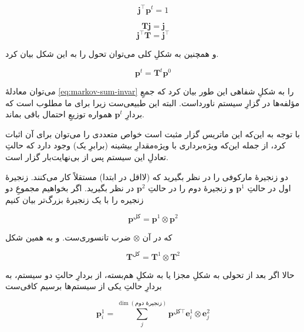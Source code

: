 \begin{equation} \mathbf{j}^\intercal \mathbf{p}^t = 1 \end{equation}

\begin{equation} \mathbf{T} \mathbf{j} = \mathbf{j} \end{equation}
\begin{equation} \mathbf{j}^\intercal \mathbf{T} = \mathbf{j}^\intercal \label{eq:markov-sum-invar} \end{equation}

و همچنین به شکلِ کلی می‌توان تحول را به این شکل بیان کرد.

\begin{equation} \mathbf{p}^t = \mathbf{T}^t \mathbf{p}^0 \end{equation}

می‌توان معادلهٔ 
\ref{eq:markov-sum-invar}
 را به شکلِ شفاهی این طور بیان کرد که جمعِ مؤلفه‌ها در گزارِ سیستم ناورداست. البته این طبیعی‌ست زیرا برای ما مطلوب است که بردارِ 
 \( \mathbf{p}^t \)
 همواره توزیعِ احتمال باقی بماند.

با توجه به این‌که این ماتریس گزار مثبت است خواص متعددی را می‌توان برای آن اثبات کرد، از جمله این‌که ویژه‌برداری با ویژه‌مقدارِ بیشینه (برابرِ یک) وجود دارد که حالتِ تعادلِ این سیستم پس از بی‌نهایت‌بار گزار است.


دو زنجیرهٔ مارکوفی را در نظر بگیرید که (لااقل در ابتدا) مستقلاً کار می‌کنند. زنجیرهٔ اول در حالتِ 
\( \mathbf{p}^1 \)
و زنجیرهٔ دوم را در حالتِ 
\( \mathbf{p}^2 \) 
در نظر بگیرید. اگر بخواهیم مجموعِ دو زنجیره را با یک زنجیرهٔ بزرگ‌تر بیان کنیم

\begin{equation} \mathbf{p}^{\text{کل}} = \mathbf{p}^1 \otimes \mathbf{p}^2 \end{equation}

که در آن \(\otimes\) ضرب تانسوری‌ست.
و به همین شکل

\begin{equation} \mathbf{T}^{\text{کل}} = \mathbf{T}^1 \otimes \mathbf{T}^2 \end{equation}

حالا اگر بعد از تحولی به شکلِ مجزا یا به شکلِ هم‌بسته، از بردارِ حالتِ دو سیستم، به بردارِ حالتِ یکی از سیستم‌ها برسیم کافی‌ست

\begin{equation} \mathbf{p}^1_i = \sum_{j}^{\dim(\text{زنجیرهٔ دوم})} \mathbf{p}^{\text{کل}\intercal} \mathbf{e}^1_i \otimes \mathbf{e}^2_j \end{equation}

